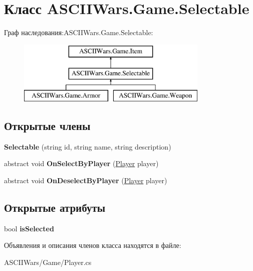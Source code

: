\hypertarget{class_a_s_c_i_i_wars_1_1_game_1_1_selectable}{}\section{Класс A\+S\+C\+I\+I\+Wars.\+Game.\+Selectable}
\label{class_a_s_c_i_i_wars_1_1_game_1_1_selectable}
Граф наследования\+:A\+S\+C\+I\+I\+Wars.\+Game.\+Selectable\+:\begin{figure}[H]
\begin{center}
\leavevmode
\includegraphics[height=3.000000cm]{class_a_s_c_i_i_wars_1_1_game_1_1_selectable}
\end{center}
\end{figure}
\subsection*{Открытые члены}
\begin{DoxyCompactItemize}
\item 
\hypertarget{class_a_s_c_i_i_wars_1_1_game_1_1_selectable_aa473dd0350842e4adfefa8e71accadd2}{}\label{class_a_s_c_i_i_wars_1_1_game_1_1_selectable_aa473dd0350842e4adfefa8e71accadd2} 
{\bfseries Selectable} (string id, string name, string description)
\item 
\hypertarget{class_a_s_c_i_i_wars_1_1_game_1_1_selectable_a95bdcf05ef9ea5f39c81ddd96294968a}{}\label{class_a_s_c_i_i_wars_1_1_game_1_1_selectable_a95bdcf05ef9ea5f39c81ddd96294968a} 
abstract void {\bfseries On\+Select\+By\+Player} (\hyperlink{class_a_s_c_i_i_wars_1_1_game_1_1_player}{Player} player)
\item 
\hypertarget{class_a_s_c_i_i_wars_1_1_game_1_1_selectable_a08a30c8786367bf45355e989b109c44b}{}\label{class_a_s_c_i_i_wars_1_1_game_1_1_selectable_a08a30c8786367bf45355e989b109c44b} 
abstract void {\bfseries On\+Deselect\+By\+Player} (\hyperlink{class_a_s_c_i_i_wars_1_1_game_1_1_player}{Player} player)
\end{DoxyCompactItemize}
\subsection*{Открытые атрибуты}
\begin{DoxyCompactItemize}
\item 
\hypertarget{class_a_s_c_i_i_wars_1_1_game_1_1_selectable_ad864445e5408f11f74f2e5c843677fb2}{}\label{class_a_s_c_i_i_wars_1_1_game_1_1_selectable_ad864445e5408f11f74f2e5c843677fb2} 
bool {\bfseries is\+Selected}
\end{DoxyCompactItemize}


Объявления и описания членов класса находятся в файле\+:\begin{DoxyCompactItemize}
\item 
A\+S\+C\+I\+I\+Wars/\+Game/Player.\+cs\end{DoxyCompactItemize}
